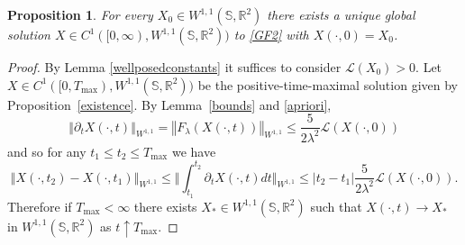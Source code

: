 \documentclass[10pt,a4paper]{amsart}
\newtheorem{proposition}{Proposition}
\def\R{\mathbb{R}}
\def\S{\mathbb{S}}
\def\length{\mathcal L}
\newcommand{\norm}[1]{{\left \Vert {#1}\right \Vert}}
\begin{document}
\begin{proposition}\label{globalexistence}
For every $X_0\in W^{1,1}(\S,\R^2)$ there exists a unique global solution
$X\in C^1([0,\infty),W^{1,1}(\S,\R^2))$ to \eqref{GF2} with $X(\cdot,0)=X_0$.
\end{proposition}

\begin{proof}

By Lemma \ref{wellposedconstants} it suffices to consider $\length(X_0)>0$.
Let
$
X\in C^1([0,T_{\max}),W^{1,1}(\S,\R^2))
$
be the positive-time-maximal solution given by Proposition~\ref{existence}.
By Lemma~\ref{bounds} and \ref{apriori},
\[
\norm{\partial_t X(\cdot,t)}_{W^{1,1}}
=\norm{F_\lambda(X(\cdot,t))}_{W^{1,1}}
\le \frac{5}{2\lambda^2}\length(X(\cdot,0))
\]
and so for any $t_1\leq t_2\leq T_{\max}$ we have
\[
\norm{X(\cdot,t_2)-X(\cdot,t_1)}_{W^{1,1}}\leq \Big\Vert \int_{t_1}^{t_2}\partial_t X(\cdot,t)dt\Big\Vert_{W^{1,1}}\leq |t_2-t_1|\frac{5}{2\lambda^2}\length(X(\cdot,0)).
\]
Therefore if $T_{\max}<\infty$ there exists $X_*\in W^{1,1}(\S,\R^2)$ such that
$X(\cdot,t)\to X_*$
in $W^{1,1}(\S,\R^2)$
as $t\uparrow T_{\max}.$


\end{proof}
\end{document}
